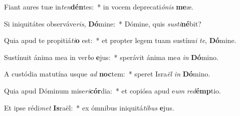\item Fiant aures tuæ in\textit{ten}\textbf{dén}tes:~* in vocem deprecati\textit{ó}\textit{nis} \textbf{me}æ.
\item Si iniquitátes observáve\textit{ris}, \textbf{Dó}mine:~* Dómine, quis \textit{sus}\textit{ti}\textbf{né}bit?
\item Quia apud te propitiá\textit{ti}\textbf{o} est:~* et propter legem tuam sustínu\textit{i} \textit{te}, \textbf{Dó}mine.
\item Sustínuit ánima mea in ver\textit{bo} \textbf{e}jus:~* sperávit ánima me\textit{a} \textit{in} \textbf{Dó}mino.
\item A custódia matutína usque \textit{ad} \textbf{noc}tem:~* speret Isra\textit{ël} \textit{in} \textbf{Dó}mino.
\item Quia apud Dóminum mise\textit{ri}\textbf{cór}dia:~* et copiósa apud e\textit{um} \textit{red}\textbf{émp}tio.
\item Et ipse rédi\textit{met} \textbf{Is}raël:~* ex ómnibus iniquitá\textit{ti}\textit{bus} \textbf{e}jus.
